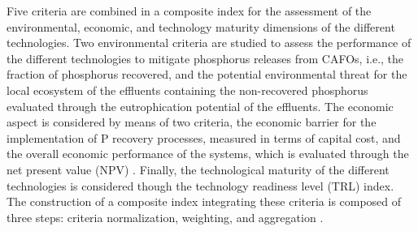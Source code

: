 \documentclass[authoryear]{elsarticle}
\begin{document}
Five criteria are combined in a composite index for the assessment of the environmental, economic, and technology maturity dimensions of the different technologies. Two environmental criteria are studied to assess the performance of the different technologies to mitigate phosphorus releases from CAFOs, i.e., the fraction of phosphorus recovered, and the potential environmental threat for the local ecosystem of the effluents containing the non-recovered phosphorus evaluated through the eutrophication potential of the effluents. The economic aspect is considered by means of two criteria, the economic barrier for the implementation of P recovery processes, measured in terms of capital cost, and the overall economic performance of the systems, which is evaluated through the net present value (NPV) \citep{sinnott2014chemical}. Finally, the technological maturity of the different technologies is considered though the technology readiness level (TRL) index. The construction of a composite index integrating these criteria is composed of three steps: criteria normalization, weighting, and aggregation \citep{MarcoCinelli2020}.

\end{document}
